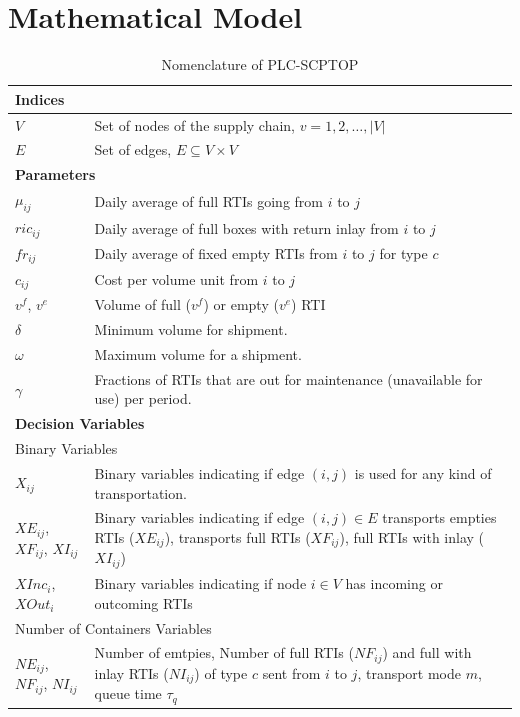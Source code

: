 

\section{Mathematical Model}


\begin{longtable}{|p{}|p{}|}
\caption{Nomenclature of PLC-SCPTOP}
\label{tab:Nomenclature}\\
\hline
\multicolumn{2}{|l|}{\textbf{Indices}}\\ \hline
$V$ & Set of nodes of the supply chain, $v = 1, 2, \dots, |V|$ \\
$E$ & Set of edges, $E \subseteq V \times V$ \\
\hline
\multicolumn{2}{|l|}{\textbf{Parameters}}\\ \hline
$\mu_{ij}$ & Daily average of full RTIs going from $i$ to $j$\\
$ric_{ij}$ & Daily average of full boxes with return inlay from $i$ to $j$\\
$fr_{ij}$ & Daily average of fixed empty RTIs from $i$ to $j$ for type $c$ \\
$c_{ij}$ & Cost per volume unit from $i$ to $j$\\
$v^{f}$, $v^{e}$ & Volume of full ($v^{f}$) or empty ($v^{e}$) RTI\\
$\delta$ & Minimum volume for shipment. \\
$\omega$ & Maximum volume for a shipment.\\
$\gamma$
& Fractions of  RTIs that are out for maintenance (unavailable for use) per period. \\
\hline
\multicolumn{2}{|l|}{\textbf{Decision Variables}}\\ \hline
\multicolumn{2}{|l|}{Binary Variables}\\ \hline
$X_{ij}$ & Binary variables indicating if edge $(i,j)$ is used for any kind of transportation. \\
$XE_{ij}$, $XF_{ij}$, $XI_{ij}$ & Binary variables indicating if edge $(i,j) \in E$ transports empties RTIs ($XE_{ij}$), transports full RTIs ($XF_{ij}$), full RTIs with inlay ($XI_{ij}$)\\
$XInc_{i}$, $XOut_{i}$ & Binary variables indicating if node $i\in V$ has incoming or outcoming RTIs\\
\hline
\multicolumn{2}{|l|}{Number of Containers Variables}\\ \hline
$NE_{ij}$, $NF_{ij}$, $NI_{ij}$ & Number of emtpies, Number of full RTIs ($NF_{ij}$) and full with inlay RTIs ($NI_{ij}$) of type $c$ sent from $i$ to $j$, transport mode $m$, queue time $\tau_q$ \\

\end{longtable}
